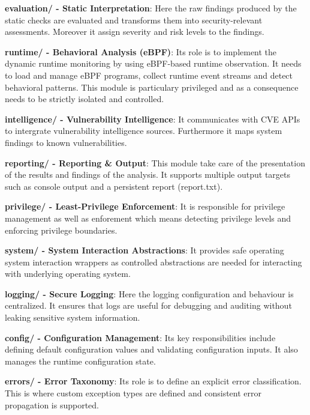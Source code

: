 \textbf{evaluation/ - Static Interpretation}: Here the raw findings produced by the static checks are evaluated and transforms them into security-relevant assessments. Moreover it assign severity and risk levels to the findings.\newline

\textbf{runtime/ - Behavioral Analysis (eBPF)}: Its role is to implement the dynamic runtime monitoring by using eBPF-based runtime observation. It needs to load and manage eBPF programs, collect runtime event streams and detect behavioral patterns. This module is particulary privileged and as a consequence needs to be strictly isolated and controlled.\newline

\textbf{intelligence/ - Vulnerability Intelligence}: It communicates with CVE APIs to intergrate vulnerability intelligence sources. Furthermore it maps system findings to known vulnerabilities. \newline

\newpage

\textbf{reporting/ - Reporting \& Output}: This module take care of the presentation of the results and findings of the analysis. It supports multiple output targets such as console output and a persistent report (report.txt).\newline

\textbf{privilege/ - Least-Privilege Enforcement}: It is responsible for privilege management as well as enforement which means detecting privilege levels and enforcing privilege boundaries.\newline

\textbf{system/ - System Interaction Abstractions}: It provides safe operating system interaction wrappers as controlled abstractions are needed for interacting with underlying operating system.\newline

\textbf{logging/ - Secure Logging}: Here the logging configuration and behaviour is centralized. It ensures that logs are useful for debugging and auditing without leaking sensitive system information.\newline

\textbf{config/ - Configuration Management}: Its key responsibilities include defining default configuration values and validating configuration inputs. It also manages the runtime configuration state.\newline

\textbf{errors/ - Error Taxonomy}: Its role is to define an explicit error classification. This is where custom exception types are defined and consistent error propagation is supported.\newline

